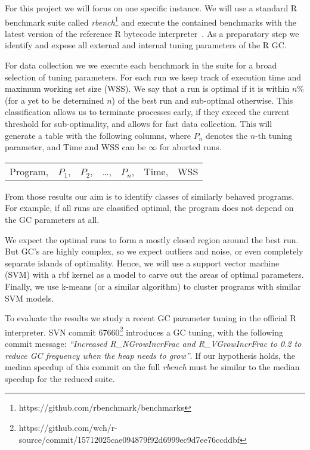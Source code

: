 \documentclass[12pt]{article}
\begin{document}
For this project we will focus on one specific instance.
We will use a standard R benchmark suite called \emph{rbench}\footnote{https://github.com/rbenchmark/benchmarks} and execute the contained benchmarks with the latest version of the reference R bytecode interpreter~\cite{r}. 
As a preparatory step we identify and expose all external and internal tuning parameters of the R GC.

For data collection we we execute each benchmark in the suite for a broad selection of tuning parameters.
For each run we keep track of execution time and maximum working set size (WSS).
We say that a run is optimal if it is within $n\%$ (for a yet to be determined $n$) of the best run and sub-optimal otherwise.
This classification allows us to terminate processes early, if they exceed the current threshold for sub-optimality, and allows for fast data collection.
This will generate a table with the following columns, where $P_n$ denotes the $n$-th tuning parameter, and Time and WSS can be $\infty$ for aborted runs.

\bigskip
\begin{tabular}{l l l l l l l}
  Program, & $P_1$, & $P_2$, & \dots, & $P_n$, & Time, & WSS \\
\end{tabular}
\bigskip

\noindent From those results our aim is to identify classes of similarly behaved programs.
For example, if all runs are classified optimal, the program does not depend on the GC parameters at all.

We expect the optimal runs to form a mostly closed region around the best run.
But GC's are highly complex, so we expect outliers and noise, or even completely separate islands of optimality.
Hence, we will use a support vector machine (SVM) with a rbf kernel as a model to carve out the areas of optimal parameters.
Finally, we use k-means (or a similar algorithm) to cluster programs with similar SVM models.

To evaluate the results we study a recent GC parameter tuning in the official R interpreter.
SVN commit 67660\footnote{https://github.com/wch/r-source/commit/15712025cae094879f92d6999ec9d7ee76ccddbf} introduces a GC tuning,
with the following commit message: \emph{``Increased R\_NGrowIncrFrac and R\_VGrowIncrFrac to 0.2 to reduce GC frequency when the heap needs to grow''}.
If our hypothesis holds, the median speedup of this commit on the full \emph{rbench} must be similar to the median speedup for the reduced suite. 
\end{document}

